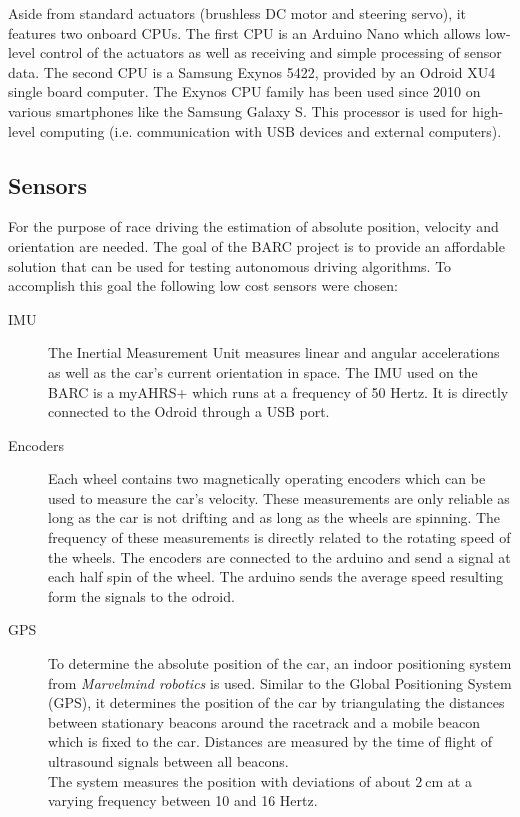 Aside from standard actuators (brushless DC motor and steering servo), it features two onboard CPUs. The first CPU is an Arduino Nano which allows low-level control of the actuators as well as receiving and simple processing of sensor data. The second CPU is a Samsung Exynos 5422, provided by an Odroid XU4 single board computer. The Exynos CPU family has been used since 2010 on various smartphones like the Samsung Galaxy S. This processor is used for high-level computing (i.e. communication with USB devices and external computers).
\subsection{Sensors}
For the purpose of race driving the estimation of absolute position, velocity and orientation are needed. The goal of the BARC project is to provide an affordable solution that can be used for testing autonomous driving algorithms. To accomplish this goal the following low cost  sensors were chosen:
\begin{description}
\item[IMU] The Inertial Measurement Unit measures linear and angular accelerations as well as the car's current orientation in space. The IMU used on the BARC is a myAHRS+ which runs at a frequency of 50 Hertz. It is directly connected to the Odroid through a USB port.
\item[Encoders] Each wheel contains two magnetically operating encoders which can be used to measure the car's velocity. These measurements are only reliable as long as the car is not drifting and as long as the wheels are spinning. The frequency of these measurements is directly related to the rotating speed of the wheels. The encoders are connected to the arduino and send a signal at each half spin of the wheel. The arduino sends the average speed resulting form the signals to the odroid.
\item[GPS] To determine the absolute position of the car, an indoor positioning system from \emph{Marvelmind robotics} \cite{marvelmind} is used. Similar to the Global Positioning System (GPS), it determines the position of the car by triangulating the distances between stationary beacons around the racetrack and a mobile beacon which is fixed to the car. Distances are measured by the time of flight of ultrasound signals between all beacons.\\
The system measures the position with deviations of about $\SI{2}{\centi\meter}$ at a varying frequency between 10 and 16 Hertz.
\end{description}


